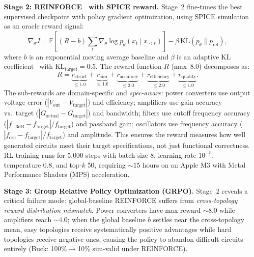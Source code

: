 \documentclass[conference]{IEEEtran}
\begin{document}
\textbf{Stage 2: REINFORCE~\cite{williams1992reinforce} with SPICE reward.}
Stage~2 fine-tunes the best supervised checkpoint with policy gradient
optimization, using SPICE simulation as an oracle reward signal:
\begin{equation}
\nabla_\theta J = \mathbb{E}\!\left[ (R - b) \sum_t \nabla_\theta \log
p_\theta(x_t \mid x_{<t}) \right] - \beta \,
\text{KL}(p_\theta \| p_\text{ref}),
\label{eq:rl_loss}
\end{equation}
where $b$ is an exponential moving average baseline and $\beta$ is an
adaptive KL coefficient~\cite{autocircuitrl} with
$\text{KL}_\text{target}\!=\!0.5$. The reward function $R$ (max~8.0)
decomposes as:
\begin{equation}
R = \underbrace{r_\text{struct}}_{\leq 1.0} +
\underbrace{r_\text{sim}}_{\leq 1.0} +
\underbrace{r_\text{accuracy}}_{\leq 3.0} +
\underbrace{r_\text{efficiency}}_{\leq 2.0} +
\underbrace{r_\text{quality}}_{\leq 1.0}.
\label{eq:reward}
\end{equation}
The sub-rewards are domain-specific and \emph{spec-aware}: power
converters use output voltage error ($|V_\text{out} - V_\text{target}|$)
and efficiency; amplifiers use gain accuracy vs.\ target
($|G_\text{actual} - G_\text{target}|$) and bandwidth; filters use
cutoff frequency accuracy ($|f_{-3\text{dB}} - f_\text{target}| / f_\text{target}$)
and passband gain; oscillators use frequency accuracy
($|f_\text{osc} - f_\text{target}| / f_\text{target}$) and amplitude.
This ensures the reward measures how well generated circuits meet
their target specifications, not just functional correctness.
RL training runs for 5,000 steps with batch size 8, learning rate
$10^{-5}$, temperature 0.8, and top-$k$ 50, requiring $\sim$15 hours
on an Apple M3 with Metal Performance Shaders (MPS) acceleration.

\textbf{Stage 3: Group Relative Policy Optimization (GRPO).}
\label{sec:grpo}
Stage~2 reveals a critical failure mode: global-baseline
REINFORCE suffers from \emph{cross-topology reward distribution
mismatch}. Power converters have max reward $\sim$8.0 while amplifiers
reach $\sim$4.0; when the global baseline $b$ settles near the
cross-topology mean, easy topologies receive systematically positive
advantages while hard topologies receive negative ones, causing the
policy to abandon difficult circuits entirely (Buck: 100\%$\to$10\%
sim-valid under REINFORCE).
\end{document}
